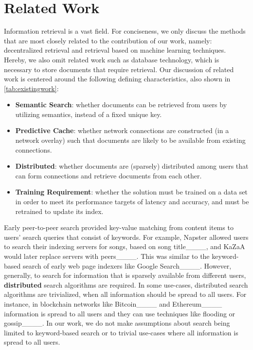 \section{Related Work}
\label{sec:relatedwork}

Information retrieval is a vast field. For conciseness, we only discuss the methods that are most closely related to the contribution of our work, namely: decentralized retrieval and retrieval based on machine learning techniques.
Hereby, we also omit related work such as database technology, which is necessary to store documents that require retrieval.
Our discussion of related work is centered around the following defining characteristics, also shown in \autoref{tab:existingwork}:

\begin{itemize}
   \item \textbf{Semantic Search}: whether documents can be retrieved from users by utilizing semantics, instead of a fixed unique key.
   \item \textbf{Predictive Cache}: whether network connections are constructed (in a network overlay) such that documents are likely to be available from existing connections.
   \item \textbf{Distributed}: whether documents are (sparsely) distributed among users that can form connections and retrieve documents from each other.
   \item \textbf{Training Requirement}: whether the solution must be trained on a data set in order to meet its performance targets of latency and accuracy, and must be retrained to update its index.
\end{itemize}


Early peer-to-peer search provided key-value matching from content items to users' search queries that consist of keywords.
For example, Napster allowed users to search their indexing servers for songs, based on song title____, and
KaZaA would later replace servers with peers____.
This was similar to the keyword-based search of early web page indexers like Google Search____.
However, generally, to search for information that is sparsely available from different users, \textbf{distributed} search algorithms are required.
In some use-cases, distributed search algorithms are trivialized, when all information should be spread to all users.
For instance, in blockchain networks like Bitcoin____ and Ethereum____ information is spread to all users and they can use techniques like flooding or gossip____. In our work, we do not make assumptions about search being limited to keyword-based search or to trivial use-cases where all information is spread to all users.

